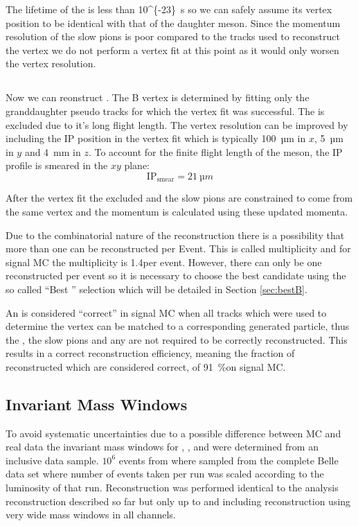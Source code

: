 \documentclass[a4paper]{report}
\def\BMultiplicity{1.4}
\def\CorrectRecoEff{\SI{91}{\%}}
\begin{document}
The lifetime of the \PDstpm is less than \SI{10^{-23}}{s} so we can safely
assume its vertex position to be identical with that of the daughter \PD meson.
Since the momentum resolution of the slow pions is poor compared to the tracks
used to reconstruct the \PD vertex we do not perform a vertex fit at this point
as it would only worsen the vertex resolution.

\subsection{\texorpdfstring{\PBz}{B0}}

Now we can reonstruct \ddk. The B vertex is determined by fitting only the
granddaughter \PD pseudo tracks for which the vertex fit was successful. The
\PKzS is excluded due to it's long flight length. The vertex resolution can be
improved by including the IP position in the vertex fit which is typically
\SI{100}{µm} in $x$, \SI{5}{µm} in $y$ and \SI{4}{mm} in $z$. To account for the
finite flight length of the \PB meson, the IP profile is smeared in the
$xy$ plane:
\[ \text{IP}_{\text{smear}} = \SI{21}{µm} \]

After the vertex fit the excluded \PKzS and the slow pions are constrained to
come from the same vertex and the \PBz momentum is calculated using these
updated momenta.

Due to the combinatorial nature of the reconstruction there is a possibility
that more than one \PBz can be reconstructed per Event. This is called
multiplicity and for signal MC the multiplicity is \BMultiplicity per event.
However, there can only be one reconstructed \ddk per event so it is necessary
to choose the best candidate using the so called ``Best \PB'' selection which
will be detailed in Section \ref{sec:bestB}.

An \PBz is considered ``correct'' in signal MC when all tracks which were used
to determine the vertex can be matched to a corresponding generated particle,
thus the \PKzS, the slow pions and any \Pgpz are not required to be correctly
reconstructed. This results in a correct reconstruction efficiency, meaning the
fraction of reconstructed \PBz which are considered correct, of
\CorrectRecoEff on signal MC.

\subsection{Invariant Mass Windows}
\label{sec:masscuts}

To avoid systematic uncertainties due to a possible difference between MC and
real data the invariant mass windows for \Pgpz, \PKzS, \PD and \PDstpm were
determined from an inclusive data sample. $10^6$ events from where sampled from
the complete Belle data set where number of events taken per run was scaled
according to the luminosity of that run. Reconstruction was performed identical
to the analysis reconstruction described so far but only up to and including
\PDstpm reconstruction using very wide mass windows in all channels.
\end{document}
